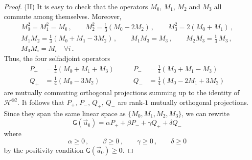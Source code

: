 \documentclass[12pt]{amsart}
\theoremstyle{definition}
\newcommand{\hh}{\mathcal{H}} %
\newcommand{\G}{\mathsf{G}}%
\begin{document}
\begin{proof}
(II) It is easy to check that the operators $M_0$, $M_1$, $M_2$ and $M_3$ all commute among themselves. Moreover,
\begin{gather*}
M_0^2 = M_1^2 = M_0\,, \qquad M_2^2 = \frac{1}{3} (M_0 - 2 M_2)\,, \qquad M_3^2 = 2(M_0+M_1)\,,\\
M_1 M_2 = \frac{1}{3}(M_0+M_1-3M_2)\,, \qquad M_1 M_3 = M_3\,, \qquad M_2 M_3 = \frac{1}{3} \, M_3 \,,\\
M_0 M_i = M_i \quad \forall i\,.
\end{gather*}
Thus, the four selfadjoint operators
\begin{align*}
P_+ & = \frac{1}{4} (M_0 + M_1 + M_3) & \qquad
P_- & = \frac{1}{4} (M_0 + M_1 - M_3) \\
Q_+ & = \frac{1}{4} (M_0 - 3M_2)  & \qquad
Q_- & = \frac{1}{4} (M_0 - 2M_1 + 3M_2)
\end{align*}
are mutually commuting orthogonal projections summing up to the identity of $\hh^{\otimes 2}$. It follows that $P_+$, $P_-$, $Q_+$, $Q_-$ are rank-$1$ mutually orthogonal projections. Since they span the same linear space as $\{M_0,M_1,M_2,M_3\}$, we can rewrite
\begin{equation}\label{eq:M111}
\G(\vec{u}_0) = \alpha P_+ + \beta P_- + \gamma Q_+ + \delta Q_-
\end{equation}
where
\begin{equation}\label{eq:pos1}
\alpha\geq 0\,, \qquad \beta\geq 0\,, \qquad \gamma\geq 0\,, \qquad \delta\geq 0
\end{equation}
by the positivity condition $\G(\vec{u}_0)\geq 0$.


\end{proof}
\end{document}
